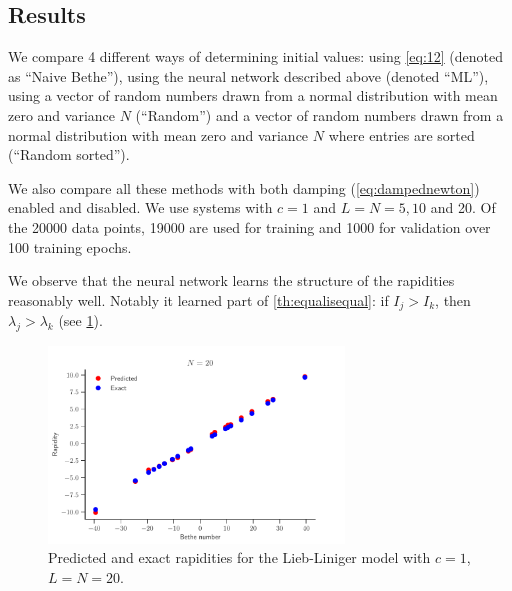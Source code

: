 \documentclass[11pt, a4paper]{report} %
\begin{document}
\subsection{Results}
We compare 4 different ways of determining initial values: using \cref{eq:12} (denoted as ``Naive Bethe''), using the neural network described above (denoted ``ML''), using a vector of random numbers drawn from a normal distribution with mean zero and variance \(N\) (``Random'') and a vector of random numbers drawn from a normal distribution with mean zero and variance \(N\) where entries are sorted (``Random sorted'').

We also compare all these methods with both damping (\cref{eq:dampednewton}) enabled and disabled. We use systems with \(c=1\) and \(L=N=5,10\) and 20.
Of the 20000 data points, 19000 are used for training and 1000 for validation over 100 training epochs.

We observe that the neural network learns the structure of the rapidities reasonably well.
Notably it learned part of \cref{th:equalisequal}: if \(I_j >I_k\), then \(\lambda_j > \lambda_k\) (see \cref{fig:rapidities}).

\begin{figure}[tb]
  \centering
  \includegraphics[width=0.70\textwidth]{rapidities_20.pdf}
  \caption{Predicted and exact rapidities for the Lieb-Liniger model with \(c=1\), \(L=N=20\).}\label{fig:rapidities}
\end{figure}
\end{document}
